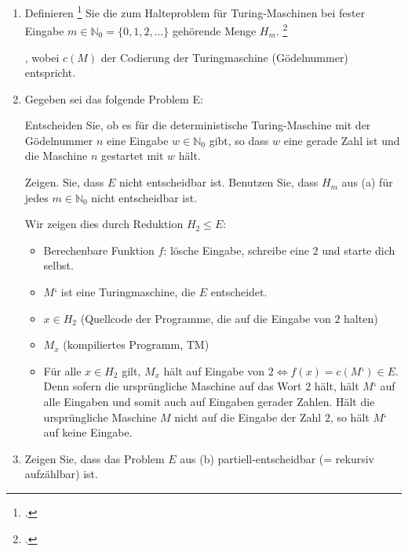 \documentclass{bschlangaul-aufgabe}
\begin{document}

\begin{enumerate}


\item Definieren \footcite{examen:66115:2014:03}
Sie die zum Halteproblem für Turing-Maschinen bei fester Eingabe $m \in
\mathbb{N}_0 = \{ 0, 1, 2, \dots \}$ gehörende Menge $H_m$.
\footcite[Seite 55]{theo:fs:3}

\begin{bAntwort}
,
wobei $c(M)$ der Codierung der Turingmaschine (Gödelnummer) entspricht.
\end{bAntwort}


\item Gegeben sei das folgende Problem E:

Entscheiden Sie, ob es für die deterministische Turing-Maschine mit der
Gödelnummer $n$ eine Eingabe $w \in \mathbb{N}_0$ gibt, so dass $w$ eine
gerade Zahl ist und die Maschine $n$ gestartet mit $w$ hält.

Zeigen. Sie, dass $E$ nicht entscheidbar ist. Benutzen Sie, dass $H_m$
aus (a) für jedes $m \in \mathbb{N}_0$ nicht entscheidbar ist.

\begin{bAntwort}
Wir zeigen dies durch Reduktion $H_2 \leq E$:
\begin{itemize}
\item Berechenbare Funktion $f$: lösche Eingabe, schreibe eine $2$ und
starte dich selbst.

\item $M‘$ ist eine Turingmaschine, die $E$ entscheidet.

\item $x \in H_2$ (Quellcode der Programme, die auf die Eingabe von $2$
halten)

\item $M_x$ (kompiliertes Programm, TM)

\item Für alle $x \in H_2$ gilt, $M_x$ hält auf Eingabe von $2
\Leftrightarrow f(x) = c(M‘) \in E$. Denn sofern die ursprüngliche
Maschine auf das Wort $2$ hält, hält $M‘$ auf alle Eingaben und somit
auch auf Eingaben gerader Zahlen. Hält die ursprüngliche Maschine $M$
nicht auf die Eingabe der Zahl $2$, so hält $M‘$ auf keine Eingabe.
\end{itemize}
\end{bAntwort}


\item Zeigen Sie, dass das Problem $E$ aus (b) partiell-entscheidbar (=
rekursiv aufzählbar) ist.

\end{enumerate}
\end{document}
